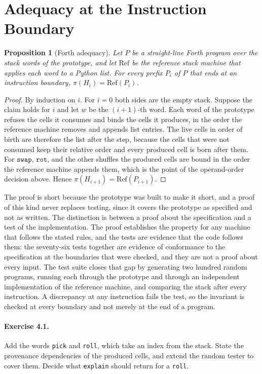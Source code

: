 \documentclass[11pt,oneside]{report}
\theoremstyle{plain}
\newtheorem{proposition}{Proposition}[chapter]
\theoremstyle{definition}
\theoremstyle{remark}
\begin{document}
\section{Adequacy at the Instruction Boundary}

\begin{proposition}[Forth adequacy]\label{prop:forth}
Let $P$ be a straight-line Forth program over the stack words of the prototype, and let $\mathrm{Ref}$ be the reference stack machine that applies each word to a Python list. For every prefix $P_i$ of $P$ that ends at an instruction boundary, $\pi(H_i)=\mathrm{Ref}(P_i)$.
\end{proposition}

\begin{proof}
By induction on $i$. For $i=0$ both sides are the empty stack. Suppose the claim holds for $i$ and let $w$ be the $(i+1)$-th word. Each word of the prototype refuses the cells it consumes and binds the cells it produces, in the order the reference machine removes and appends list entries. The live cells in order of birth are therefore the list after the step, because the cells that were not consumed keep their relative order and every produced cell is born after them. For $\mathtt{swap}$, $\mathtt{rot}$, and the other shuffles the produced cells are bound in the order the reference machine appends them, which is the point of the operand-order decision above. Hence $\pi(H_{i+1})=\mathrm{Ref}(P_{i+1})$.
\end{proof}

The proof is short because the prototype was built to make it short, and a proof of this kind never replaces testing, since it covers the prototype as specified and not as written. The distinction is between a proof about the specification and a test of the implementation. The proof establishes the property for any machine that follows the stated rules, and the tests are evidence that the code follows them: the seventy-six tests together are evidence of conformance to the specification at the boundaries that were checked, and they are not a proof about every input. The test suite closes that gap by generating two hundred random programs, running each through the prototype and through an independent implementation of the reference machine, and comparing the stack after every instruction. A discrepancy at any instruction fails the test, so the invariant is checked at every boundary and not merely at the end of a program.

\paragraph{Exercise 4.1.} Add the words \texttt{pick} and \texttt{roll}, which take an index from the stack. State the provenance dependencies of the produced cells, and extend the random tester to cover them. Decide what \texttt{explain} should return for a \texttt{roll}.
\end{document}
